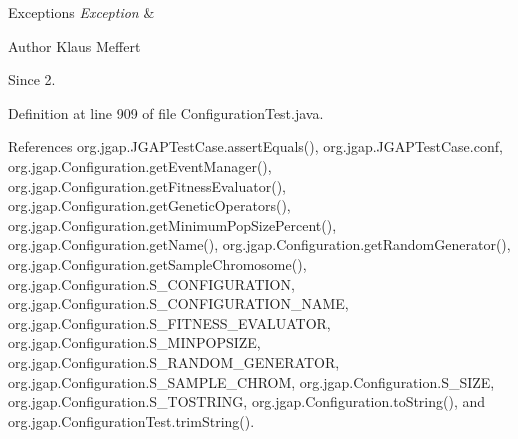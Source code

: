 \begin{DoxyExceptions}{Exceptions}
{\em Exception} & \\
\hline
\end{DoxyExceptions}
\begin{DoxyAuthor}{Author}
Klaus Meffert 
\end{DoxyAuthor}
\begin{DoxySince}{Since}
2. 
\end{DoxySince}


Definition at line 909 of file Configuration\-Test.\-java.



References org.\-jgap.\-J\-G\-A\-P\-Test\-Case.\-assert\-Equals(), org.\-jgap.\-J\-G\-A\-P\-Test\-Case.\-conf, org.\-jgap.\-Configuration.\-get\-Event\-Manager(), org.\-jgap.\-Configuration.\-get\-Fitness\-Evaluator(), org.\-jgap.\-Configuration.\-get\-Genetic\-Operators(), org.\-jgap.\-Configuration.\-get\-Minimum\-Pop\-Size\-Percent(), org.\-jgap.\-Configuration.\-get\-Name(), org.\-jgap.\-Configuration.\-get\-Random\-Generator(), org.\-jgap.\-Configuration.\-get\-Sample\-Chromosome(), org.\-jgap.\-Configuration.\-S\-\_\-\-C\-O\-N\-F\-I\-G\-U\-R\-A\-T\-I\-O\-N, org.\-jgap.\-Configuration.\-S\-\_\-\-C\-O\-N\-F\-I\-G\-U\-R\-A\-T\-I\-O\-N\-\_\-\-N\-A\-M\-E, org.\-jgap.\-Configuration.\-S\-\_\-\-F\-I\-T\-N\-E\-S\-S\-\_\-\-E\-V\-A\-L\-U\-A\-T\-O\-R, org.\-jgap.\-Configuration.\-S\-\_\-\-M\-I\-N\-P\-O\-P\-S\-I\-Z\-E, org.\-jgap.\-Configuration.\-S\-\_\-\-R\-A\-N\-D\-O\-M\-\_\-\-G\-E\-N\-E\-R\-A\-T\-O\-R, org.\-jgap.\-Configuration.\-S\-\_\-\-S\-A\-M\-P\-L\-E\-\_\-\-C\-H\-R\-O\-M, org.\-jgap.\-Configuration.\-S\-\_\-\-S\-I\-Z\-E, org.\-jgap.\-Configuration.\-S\-\_\-\-T\-O\-S\-T\-R\-I\-N\-G, org.\-jgap.\-Configuration.\-to\-String(), and org.\-jgap.\-Configuration\-Test.\-trim\-String().



